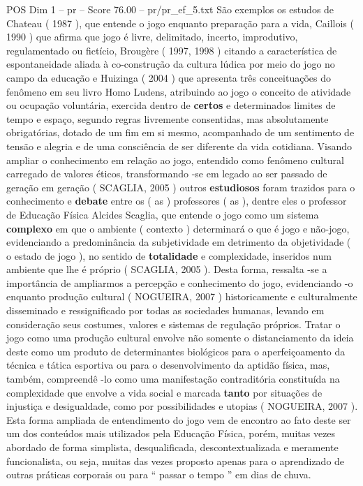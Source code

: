 \begin{textsample}{POS Dim 1 – pr – Score 76.00 – pr/pr\_ef\_5.txt}
São exemplos os estudos de Chateau ( 1987 ), que entende o jogo enquanto preparação para a vida, Caillois ( 1990 ) que afirma que jogo é livre, delimitado, incerto, improdutivo, regulamentado ou fictício, Brougère ( 1997, 1998 ) citando a característica de espontaneidade aliada à co-construção da cultura lúdica por meio do jogo no campo da educação e Huizinga ( 2004 ) que apresenta três conceituações do fenômeno em seu livro Homo Ludens, atribuindo ao jogo o conceito de atividade ou ocupação voluntária, exercida dentro de \textbf{certos} e determinados limites de tempo e espaço, segundo regras livremente consentidas, mas absolutamente obrigatórias, dotado de um fim em si mesmo, acompanhado de um sentimento de tensão e alegria e de uma consciência de ser diferente da vida cotidiana.
Visando ampliar o conhecimento em relação ao jogo, entendido como fenômeno cultural carregado de valores éticos, transformando -se em legado ao ser passado de geração em geração ( SCAGLIA, 2005 ) outros \textbf{estudiosos} foram trazidos para o conhecimento e \textbf{debate} entre os ( as ) professores ( as ), dentre eles o professor de Educação Física Alcides Scaglia, que entende o jogo como um sistema \textbf{complexo} em que o ambiente ( contexto ) determinará o que é jogo e não-jogo, evidenciando a predominância da subjetividade em detrimento da objetividade ( o estado de jogo ), no sentido de \textbf{totalidade} e complexidade, inseridos num ambiente que lhe é próprio ( SCAGLIA, 2005 ).
Desta forma, ressalta -se a importância de ampliarmos a percepção e conhecimento do jogo, evidenciando -o enquanto produção cultural ( NOGUEIRA, 2007 ) historicamente e culturalmente disseminado e ressignificado por todas as sociedades humanas, levando em consideração seus costumes, valores e sistemas de regulação próprios.
Tratar o jogo como uma produção cultural envolve não somente o distanciamento da ideia deste como um produto de determinantes biológicos para o aperfeiçoamento da técnica e tática esportiva ou para o desenvolvimento da aptidão física, mas, também, compreendê -lo como uma manifestação contraditória constituída na complexidade que envolve a vida social e marcada \textbf{tanto} por situações de injustiça e desigualdade, como por possibilidades e utopias ( NOGUEIRA, 2007 ).
Esta forma ampliada de entendimento do jogo vem de encontro ao fato deste ser um dos conteúdos mais utilizados pela Educação Física, porém, muitas vezes abordado de forma simplista, desqualificada, descontextualizada e meramente funcionalista, ou seja, muitas das vezes proposto apenas para o aprendizado de outras práticas corporais ou para “ passar o tempo ” em dias de chuva.

\end{textsample}
